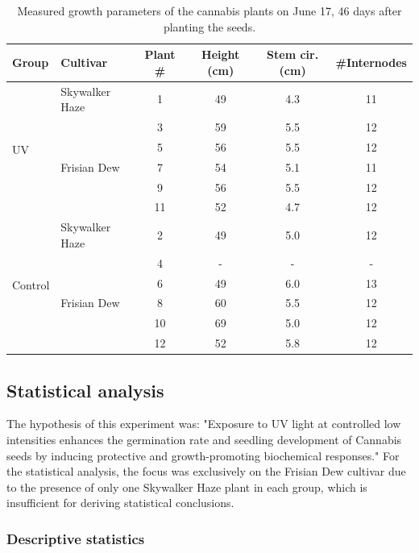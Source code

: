 \begin{table}[H]
    \caption[Measured growth parameters of the cannabis plants]{Measured growth parameters of the cannabis plants on June 17, \num[mode=text]{46} days after planting the seeds.}
    \label{tab:measured_growth_parameters}
    \begin{tabularx}{\linewidth}{llcccc}
        \toprule
        \textbf{Group} & \textbf{Cultivar} & \textbf{Plant \#} & \textbf{Height (\unit[mode=text]{\cm})} & \textbf{Stem cir. (\unit[mode=text]{\cm})} & \textbf{\#{}Internodes} \\
        \midrule
        \multirow{6}{*}{UV} & Skywalker Haze & 1 & 49 & 4.3 & 11 \\
        & \multirow[t]{5}{*}{Frisian Dew} & 3 & 59 & 5.5 & 12 \\
        & & 5 & 56 & 5.5 & 12 \\
        & & 7 & 54 & 5.1 & 11 \\
        & & 9 & 56 & 5.5 & 12 \\
        & & 11 & 52 & 4.7 & 12 \\
        \midrule
        \multirow{6}{*}{Control} & Skywalker Haze & 2 & 49 & 5.0 & 12 \\
        & \multirow[t]{5}{*}{Frisian Dew} & 4 & - & - & - \\
        & & 6 & 49 & 6.0 & 13 \\
        & & 8 & 60 & 5.5 & 12 \\
        & & 10 & 69 & 5.0 & 12 \\
        & & 12 & 52 & 5.8 & 12 \\
        \bottomrule
    \end{tabularx}
\end{table}

\subsection{Statistical analysis}

The hypothesis of this experiment was: "Exposure to UV light at controlled low intensities enhances the germination rate and seedling development of Cannabis seeds by inducing protective and growth-promoting biochemical responses." For the statistical analysis, the focus was exclusively on the Frisian Dew cultivar due to the presence of only one Skywalker Haze plant in each group, which is insufficient for deriving statistical conclusions.

\subsubsection{Descriptive statistics}

